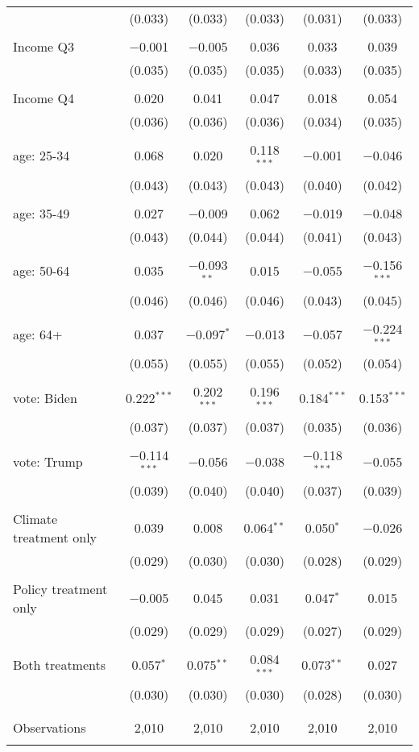 \begin{tabular}{@{\extracolsep{5pt}}lccccc}
  & (0.033) & (0.033) & (0.033) & (0.031) & (0.033) \\ 
  & & & & & \\ 
 Income Q3 & $-$0.001 & $-$0.005 & 0.036 & 0.033 & 0.039 \\ 
  & (0.035) & (0.035) & (0.035) & (0.033) & (0.035) \\ 
  & & & & & \\ 
 Income Q4 & 0.020 & 0.041 & 0.047 & 0.018 & 0.054 \\ 
  & (0.036) & (0.036) & (0.036) & (0.034) & (0.035) \\ 
  & & & & & \\ 
 age: 25-34 & 0.068 & 0.020 & 0.118$^{***}$ & $-$0.001 & $-$0.046 \\ 
  & (0.043) & (0.043) & (0.043) & (0.040) & (0.042) \\ 
  & & & & & \\ 
 age: 35-49 & 0.027 & $-$0.009 & 0.062 & $-$0.019 & $-$0.048 \\ 
  & (0.043) & (0.044) & (0.044) & (0.041) & (0.043) \\ 
  & & & & & \\ 
 age: 50-64 & 0.035 & $-$0.093$^{**}$ & 0.015 & $-$0.055 & $-$0.156$^{***}$ \\ 
  & (0.046) & (0.046) & (0.046) & (0.043) & (0.045) \\ 
  & & & & & \\ 
 age: 64+ & 0.037 & $-$0.097$^{*}$ & $-$0.013 & $-$0.057 & $-$0.224$^{***}$ \\ 
  & (0.055) & (0.055) & (0.055) & (0.052) & (0.054) \\ 
  & & & & & \\ 
 vote: Biden & 0.222$^{***}$ & 0.202$^{***}$ & 0.196$^{***}$ & 0.184$^{***}$ & 0.153$^{***}$ \\ 
  & (0.037) & (0.037) & (0.037) & (0.035) & (0.036) \\ 
  & & & & & \\ 
 vote: Trump & $-$0.114$^{***}$ & $-$0.056 & $-$0.038 & $-$0.118$^{***}$ & $-$0.055 \\ 
  & (0.039) & (0.040) & (0.040) & (0.037) & (0.039) \\ 
  & & & & & \\ 
 Climate treatment only & 0.039 & 0.008 & 0.064$^{**}$ & 0.050$^{*}$ & $-$0.026 \\ 
  & (0.029) & (0.030) & (0.030) & (0.028) & (0.029) \\ 
  & & & & & \\ 
 Policy treatment only & $-$0.005 & 0.045 & 0.031 & 0.047$^{*}$ & 0.015 \\ 
  & (0.029) & (0.029) & (0.029) & (0.027) & (0.029) \\ 
  & & & & & \\ 
 Both treatments & 0.057$^{*}$ & 0.075$^{**}$ & 0.084$^{***}$ & 0.073$^{**}$ & 0.027 \\ 
  & (0.030) & (0.030) & (0.030) & (0.028) & (0.030) \\ 
  & & & & & \\ 
\hline \\[-1.8ex] 

Observations & 2,010 & 2,010 & 2,010 & 2,010 & 2,010 \\ 
\hline 
\hline \\[-1.8ex] 
\end{tabular} 